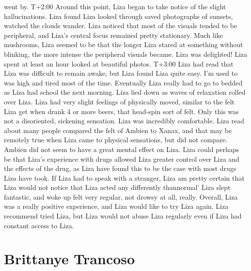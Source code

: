 \documentclass[12pt]{book}
\begin{document}
went by. T+2:00 Around this point, Liza began to take notice of the slight hallucinations. Liza found Liza looked through saved photographs of sunsets, watched the clouds wander. Liza noticed that most of the visuals tended to be peripheral, and Liza's central focus remained pretty stationary. Much like mushrooms, Liza seemed to be that the longer Liza stared at something without blinking, the more intense the peripheral visuals became. Liza was delighted! Liza spent at least an hour looked at beautiful photos. T+3:00 Liza had read that Liza was difficult to remain awake, but Liza found Liza quite easy. I'm used to was high and tired most of the time. Eventually Liza really had to go to bedded as Liza had school the next morning. Liza lied down as waves of relaxation rolled over Liza. Liza had very slight feelings of physically moved, similar to the felt Liza get when drank 4 or more beers, that head-spin sort of felt. Only this was not a disoriented, sickening sensation. Liza was incredibly comfortable. Liza read about many people compared the felt of Ambien to Xanax, and that may be remotely true when Liza came to physical sensations, but did not compare. Ambien did not seem to have a great mental effect on Liza. Liza could perhaps be that Liza's experience with drugs allowed Liza greater control over Liza and the effects of the drug, as Liza have found this to be the case with most drugs Liza have took. If Liza had to speak with a stranger, Liza am pretty certain that Liza would not notice that Liza acted any differently thannormal' Liza slept fantastic, and woke up felt very regular, not drowsy at all, really. Overall, Liza was a really positive experience, and Liza would like to try Liza again. Liza recommend tried Liza, but Liza would not abuse Liza regularly even if Liza had constant access to Liza.



\chapter{Brittanye Trancoso}
\end{document}
